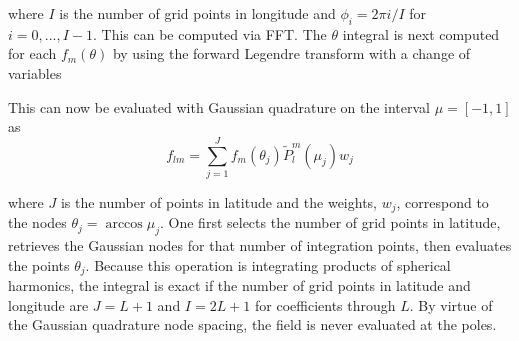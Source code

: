 \noindent where $I$ is the number of grid points in longitude and $\phi_i = 2\pi i/ I $ for $ i = 0,...,I-1$.  This can be computed via FFT. The $\theta$ integral is next computed for each $f_m(\theta)$ by using the forward Legendre transform with a change of variables 

%
%

This can now be evaluated with Gaussian quadrature on the interval $\mu = [-1, 1]$ as
\begin{equation}
f_{lm} = \sum_{j=1}^J f_m(\theta_j) \widetilde{P}_l^m(\mu_j) w_j \label{forwardlegendre}
\end{equation}

\noindent where $J$ is the number of points in latitude and the weights, $w_j$, correspond to the nodes $\theta_j = \arccos\mu_j$.  One first selects the number of grid points in latitude, retrieves the Gaussian nodes for that number of integration points, then evaluates the points $\theta_j$.  Because this operation is integrating products of spherical harmonics, the integral is exact if the number of grid points in latitude and longitude are $J = L+1$ and $I = 2L+1$ for coefficients through $L$. By virtue of the Gaussian quadrature node spacing, the field is never evaluated at the poles.

